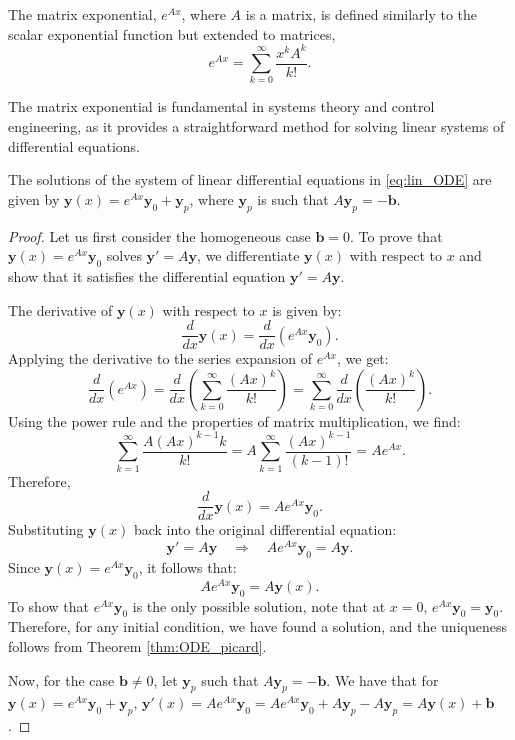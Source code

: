 \begin{definition}
The matrix exponential, $ e^{Ax} $, where $ A $ is a matrix, is defined similarly to the scalar exponential function but extended to matrices,    
\[
e^{Ax} = \sum_{k=0}^{\infty} \frac{x^k A^k}{k!}.
\]
\end{definition}
The matrix exponential is fundamental in systems theory and control engineering, as it provides a straightforward method for solving linear systems of differential equations.

\begin{proposition}
    The solutions of the system of linear differential equations in \eqref{eq:lin_ODE} are given by $ \mathbf{y}(x) = e^{Ax} \mathbf{y}_0 + \mathbf{y}_p$, where $\mathbf{y}_p$ is such that $A\mathbf{y}_p = -\mathbf{b}$.
\end{proposition}

\begin{proof}
    Let us first consider the homogeneous case $ \mathbf{b} = 0 $. To prove that $ \mathbf{y}(x) = e^{Ax} \mathbf{y}_0 $ solves $ \mathbf{y}' = A \mathbf{y} $, we differentiate $ \mathbf{y}(x) $ with respect to $ x $ and show that it satisfies the differential equation $\mathbf{y}' = A \mathbf{y}$.

    The derivative of $ \mathbf{y}(x) $ with respect to $ x $ is given by:
   \[
   \frac{d}{dx} \mathbf{y}(x) = \frac{d}{dx} \left(e^{Ax} \mathbf{y}_0\right).
   \]
   Applying the derivative to the series expansion of $ e^{Ax} $, we get:
   \[
   \frac{d}{dx} \left(e^{Ax}\right) = \frac{d}{dx} \left( \sum_{k=0}^{\infty} \frac{(Ax)^k}{k!} \right) = \sum_{k=0}^{\infty} \frac{d}{dx} \left( \frac{(Ax)^k}{k!} \right).
   \]
   Using the power rule and the properties of matrix multiplication, we find:
   \[
   \sum_{k=1}^{\infty} \frac{A (Ax)^{k-1} k}{k!} = A \sum_{k=1}^{\infty} \frac{(Ax)^{k-1}}{(k-1)!} = A e^{Ax}.
   \]
   Therefore,
   \[
   \frac{d}{dx} \mathbf{y}(x) = A e^{Ax} \mathbf{y}_0.
   \]
Substituting $ \mathbf{y}(x) $ back into the original differential equation:
   \[
   \mathbf{y}' = A \mathbf{y} \quad \Rightarrow \quad A e^{Ax} \mathbf{y}_0 = A \mathbf{y}.
   \]
   Since $ \mathbf{y}(x) = e^{Ax} \mathbf{y}_0 $, it follows that:
   \[
   A e^{Ax} \mathbf{y}_0 = A \mathbf{y}(x).
   \]
To show that $e^{Ax} \mathbf{y}_0$ is the only possible solution, note that at $x=0$, $e^{Ax} \mathbf{y}_0 = \mathbf{y}_0$. Therefore, for any initial condition, we have found a solution, and the uniqueness follows from Theorem \ref{thm:ODE_picard}.

Now, for the case $\mathbf{b} \neq 0 $, let $\mathbf{y}_p$ such that $A \mathbf{y}_p = -\mathbf{b}$. We have that for $ \mathbf{y}(x) = e^{Ax} \mathbf{y}_0 + \mathbf{y}_p$, $\mathbf{y}'(x) = A e^{Ax} \mathbf{y}_0 = A e^{Ax} \mathbf{y}_0 + A\mathbf{y}_p - A\mathbf{y}_p = A \mathbf{y}(x) + \mathbf{b}$.
\end{proof}


